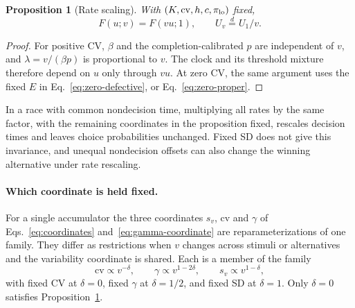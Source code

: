 \documentclass[12pt]{article}
\theoremstyle{definition}
\theoremstyle{plain}
\newtheorem{proposition}{Proposition}
\theoremstyle{remark}
\begin{document}
\begin{proposition}[Rate scaling]\label{prop:scale}
With $(K,\mathrm{cv},h,c,\pi_{\rm lo})$ fixed,
\begin{equation}
 F(u;v)=F(vu;1),\qquad U_v\overset d=U_1/v.\label{eq:scale}
\end{equation}
\end{proposition}
\begin{proof}
For positive CV, $\beta$ and the completion-calibrated $p$ are independent of $v$, and $\lambda=v/(\beta p)$ is proportional to $v$. The clock and its threshold mixture therefore depend on $u$ only through $vu$. At zero CV, the same argument uses the fixed $E$ in Eq.~\eqref{eq:zero-defective}, or Eq.~\eqref{eq:zero-proper}.
\end{proof}
In a race with common nondecision time, multiplying all rates by the same factor, with the remaining coordinates in the proposition fixed, rescales decision times and leaves choice probabilities unchanged. Fixed SD does not give this invariance, and unequal nondecision offsets can also change the winning alternative under rate rescaling.

\paragraph{Which coordinate is held fixed.} For a single accumulator the three coordinates $s_v$, $\mathrm{cv}$ and $\gamma$ of Eqs.~\eqref{eq:coordinates} and~\eqref{eq:gamma-coordinate} are reparameterizations of one family. They differ as restrictions when $v$ changes across stimuli or alternatives and the variability coordinate is shared. Each is a member of the family
\begin{equation}
 \mathrm{cv}\propto v^{-\delta},\qquad \gamma\propto v^{1-2\delta},\qquad s_v\propto v^{1-\delta},\label{eq:delta-family}
\end{equation}
with fixed CV at $\delta=0$, fixed $\gamma$ at $\delta=1/2$, and fixed SD at $\delta=1$. Only $\delta=0$ satisfies Proposition~\ref{prop:scale}.
\end{document}
